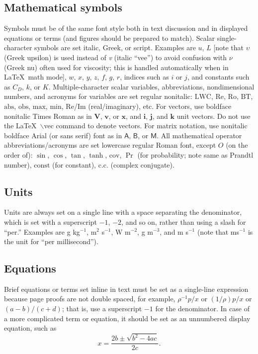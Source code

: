 \documentclass{ametsocV5}
\begin{document}
\subsection{Mathematical symbols}
Symbols must be of the same font style both in text discussion and in
displayed equations or terms (and figures should be prepared to match).
Scalar single-character symbols are set italic, Greek, or script. Examples
are $u$, $L$ [note that $\upsilon$ (Greek upsilon) is used instead of
\textit{v} (italic ``vee'') to avoid confusion with $\nu$ (Greek nu) often
used for viscosity; this is handled automatically when in \LaTeX\ math mode],
$w$, $x$, $y$, $z$, $f$, $g$, $r$, indices such as $i$ or $j$, and constants
such as $C_D$, $k$, or $K$. Multiple-character scalar variables,
abbreviations, nondimensional numbers, and acronyms for variables are set
regular nonitalic: $\mathrm{LWC}$, $\mathrm{Re}$, $\mathrm{Ro}$,
$\mathrm{BT}$, $\mathrm{abs}$, $\mathrm{obs}$, $\mathrm{max}$,
$\mathrm{min}$, $\mathrm{Re}$/$\mathrm{Im}$ (real/imaginary), etc. For
vectors, use boldface nonitalic Times Roman as in $\mathbf{V}$, $\mathbf{v}$,
or $\mathbf{x}$, and $\mathbf{i}$, $\mathbf{j}$, and $\mathbf{k}$ unit
vectors. Do not use the \LaTeX\ $\backslash$vec command to denote vectors.
For matrix notation, use nonitalic boldface Arial (or sans serif) font as in
$\bm{\mathsf{A}}$, $\bm{\mathsf{B}}$, or $\bm{\mathsf{M}}$.  All mathematical
operator abbreviations/acronyms are set lowercase regular Roman font, except
$O$ (on the order of): $\sin$, $\cos$, $\tan$, $\tanh$, $\mathrm{cov}$, $\Pr$
(for probability; note same as Prandtl number), $\mathrm{const}$ (for
constant), $\mathrm{c.c.}$ (complex conjugate).

\subsection{Units}
Units are always set on a single line with a space separating the
denominator, which is set with a superscript $-1$, $-2$, and so on, rather
than using a slash for ``per.'' Examples are g kg$^{-1}$, m$^2$ s$^{-1}$, W
m$^{-2}$, g m$^{-3}$, and m s$^{-1}$ (note that ms$^{-1}$ is the unit for
``per millisecond'').

\subsection{Equations}
Brief equations or terms set inline in text must be set as a single-line
expression because page proofs are not double spaced, for example,
$\rho^{-1}p/x$ or $(1/{\rho})p/x$ or $(a-b)/(c+d)$; that is, use a
superscript $-1$ for the denominator. In case of a more complicated term or
equation, it should be set as an unnumbered display equation, such as
\begin{displaymath} x=\frac{2b\pm\sqrt{b^{2}-4ac}}{2c}.  \end{displaymath}
\end{document}
